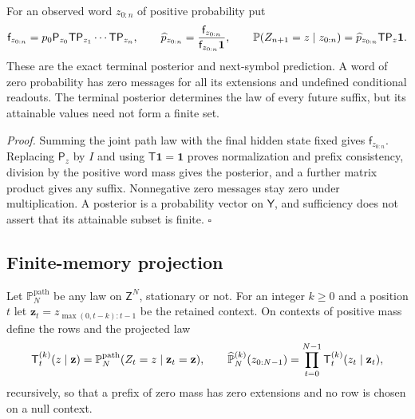 For an observed word $z_{0:n}$ of positive probability put
\begin{equation}
\mathsf f_{z_{0:n}}=p_0\mathsf P_{z_0}\mathsf T\mathsf P_{z_1}\cdots\mathsf T\mathsf P_{z_n},
\qquad
\widehat p_{z_{0:n}}=\frac{\mathsf f_{z_{0:n}}}{\mathsf f_{z_{0:n}}\mathbf 1},
\qquad
\mathbb P(Z_{n+1}=z\mid z_{0:n})=\widehat p_{z_{0:n}}\mathsf T\mathsf P_z\mathbf 1 .
\label{eq:rg-memory-filter}
\end{equation}
These are the exact terminal posterior and next-symbol prediction. A word of zero
probability has zero messages for all its extensions and undefined conditional
readouts. The terminal posterior determines the law of every future suffix, but its
attainable values need not form a finite set. 

\noindent\emph{Proof.}
Summing the joint path law with the final hidden state fixed gives
$\mathsf f_{z_{0:n}}$. Replacing $\mathsf P_z$ by $I$ and using $\mathsf T\mathbf
1=\mathbf 1$ proves normalization and prefix consistency, division by the positive
word mass gives the posterior, and a further matrix product gives any suffix.
Nonnegative zero messages stay zero under multiplication. A posterior is a
probability vector on $\mathsf Y$, and sufficiency does not assert that its
attainable subset is finite. $\square$

\subsection{Finite-memory projection}
\label{sec:rg-memory-projection}
\label{sec:rg-memory-stationary}

Let $\mathbb P^{\mathrm{path}}_N$ be any law on $\mathsf Z^N$, stationary or not. For an
integer $k\ge0$ and a position $t$ let
$\mathbf z_t=z_{\max(0,t-k):t-1}$ be the retained context. On contexts of positive
mass define the rows and the projected law
\begin{equation}
\mathsf T^{(k)}_t(z\mid\mathbf z)=\mathbb P^{\mathrm{path}}_N(Z_t=z\mid\mathbf z_t=\mathbf z),
\qquad
\widehat{\mathbb P}^{(k)}_N(z_{0:N-1})=\prod_{t=0}^{N-1}\mathsf T^{(k)}_t(z_t\mid\mathbf z_t),
\label{eq:rg-memory-projection-product}
\end{equation}
recursively, so that a prefix of zero mass has zero extensions and no row is chosen
on a null context.

